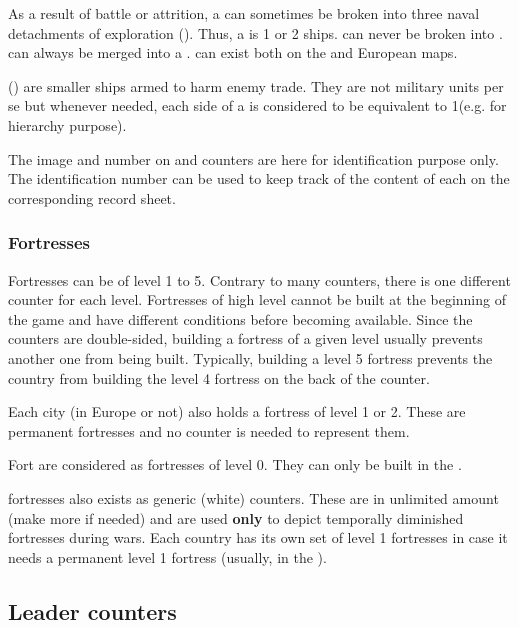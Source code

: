  As a result of battle or attrition, a \ND can
sometimes be broken into three naval detachments of exploration (\NDE).
\bparag Thus, a \NDE is 1 or 2 ships.
\bparag \NGD can never be broken into \NDE.
\NDE can always be merged into a \ND.
\bparag \NDE can exist both on the \ROTW and European maps.

\aparag[Privateers] (\corsaire) are smaller ships armed to harm enemy trade.
\bparag They are not military units per se but whenever needed, each side of a
\corsaire is considered to be equivalent to 1\ND (e.g. for hierarchy purpose).

\aparag The image and number on \FLEET and \ND counters are here for
identification purpose only.
\bparag The identification number can be used to keep track of the content of
each \FLEET on the corresponding record sheet.


\subsubsection{Fortresses}
\aparag[Levels] Fortresses can be of level 1 to 5.
\bparag Contrary to many counters, there is one different counter for each
level.
\bparag Fortresses of high level cannot be built at the beginning of the game
and have different conditions before becoming available.
\bparag Since the counters are double-sided, building a fortress of a given
level usually prevents another one from being built. Typically, building a
level 5 fortress prevents the country from building the level 4 fortress on
the back of the counter.

 Each city (in Europe or not) also holds a fortress
of level 1 or 2. These are permanent fortresses and no counter is needed to
represent them.

\aparag[Forts] Fort are considered as fortresses of level 0. They can only be
built in the \ROTW.

\aparag[Level 1] fortresses also exists as generic (white) counters. These are
in unlimited amount (make more if needed) and are used \textbf{only} to depict
temporally diminished fortresses during wars.
\bparag Each country has its own set of level 1 fortresses in case it needs a
permanent level 1 fortress (usually, in the \ROTW).



\subsection{Leader counters}


